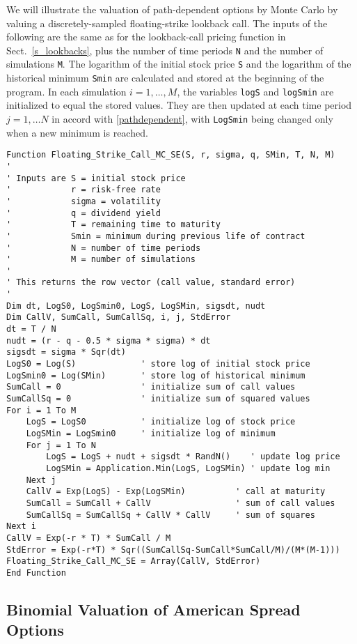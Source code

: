 We will illustrate the valuation of path-dependent options by Monte Carlo by valuing a discretely-sampled floating-strike lookback call.  
The inputs of the following are the same as for the lookback-call pricing function in Sect.~\ref{s_lookbacks}, plus the number of time periods \verb!N! and the number of simulations \verb!M!.  The logarithm of the initial stock price \verb!S! and the logarithm of the historical minimum \verb!Smin! are calculated and stored at the beginning of the program.  In each simulation $i = 1,\ldots, M$, the variables \verb!logS! and \verb!logSmin! are initialized to equal the stored values.  They are then updated at each time period $j=1,\ldots N$ in accord with \eqref{pathdependent}, with \verb!LogSmin! being changed only when a new minimum is reached.

\small\begin{verbatim}
Function Floating_Strike_Call_MC_SE(S, r, sigma, q, SMin, T, N, M)
'
' Inputs are S = initial stock price
'            r = risk-free rate
'            sigma = volatility
'            q = dividend yield
'            T = remaining time to maturity
'            Smin = minimum during previous life of contract
'            N = number of time periods
'            M = number of simulations
'
' This returns the row vector (call value, standard error)
'
Dim dt, LogS0, LogSmin0, LogS, LogSMin, sigsdt, nudt
Dim CallV, SumCall, SumCallSq, i, j, StdError
dt = T / N
nudt = (r - q - 0.5 * sigma * sigma) * dt
sigsdt = sigma * Sqr(dt)
LogS0 = Log(S)             ' store log of initial stock price
LogSmin0 = Log(SMin)       ' store log of historical minimum
SumCall = 0                ' initialize sum of call values
SumCallSq = 0              ' initialize sum of squared values
For i = 1 To M
    LogS = LogS0           ' initialize log of stock price
    LogSMin = LogSmin0     ' initialize log of minimum
    For j = 1 To N
        LogS = LogS + nudt + sigsdt * RandN()    ' update log price
        LogSMin = Application.Min(LogS, LogSMin) ' update log min
    Next j
    CallV = Exp(LogS) - Exp(LogSMin)          ' call at maturity
    SumCall = SumCall + CallV                 ' sum of call values
    SumCallSq = SumCallSq + CallV * CallV     ' sum of squares
Next i
CallV = Exp(-r * T) * SumCall / M
StdError = Exp(-r*T) * Sqr((SumCallSq-SumCall*SumCall/M)/(M*(M-1)))
Floating_Strike_Call_MC_SE = Array(CallV, StdError)
End Function
\end{verbatim}\normalsize

\subsection*{Binomial Valuation of American Spread Options}

